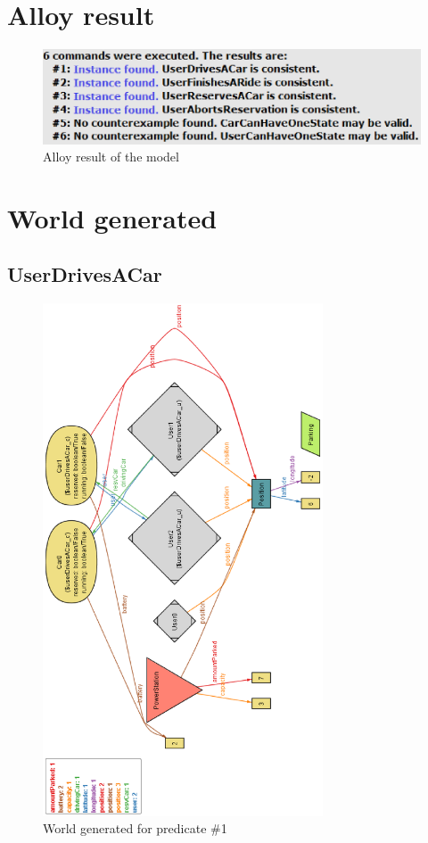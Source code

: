 \section{Alloy result}
\begin{figure}[h]
	\centering
	\includegraphics[width=\linewidth,keepaspectratio]{figures/alloy_results.eps}
	\caption{Alloy result of the model}
	\label{fig:alloy_results}
\end{figure}

\clearpage
\section{World generated}

\subsection{UserDrivesACar}
\begin{figure}[h]
	\centering
	\includegraphics[height=15.2cm,keepaspectratio]{figures/world_generated_driving.eps}
	\caption{World generated for predicate \#1}
	\label{fig:world_generated_driving}
\end{figure}

